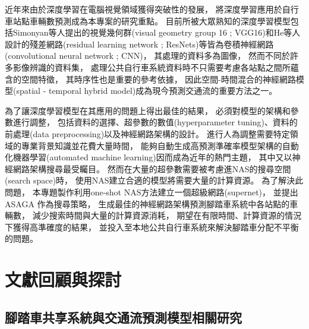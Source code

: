 \documentclass[a4paper,12pt]{extarticle}
\begin{document}
        近年來由於深度學習在電腦視覺領域獲得突破性的發展\cite{8114708}，
        將深度學習應用於自行車站點車輛數預測成為本專案的研究重點。
        目前所被大眾熟知的深度學習模型包括Simonyan等人提出的視覺幾何群(visual geometry group 16 ; VGG16)\cite{simonyan2014very}和He等人設計的殘差網路(residual learning network ; ResNets)\cite{he2016deep}等皆為卷積神經網路(convolutional neural network ; CNN)，
        其處理的資料多為圖像，
        然而不同於許多影像辨識的資料集，
        處理公共自行車系統資料時不只需要考慮各站點之間所蘊含的空間特徵，
        其時序性也是重要的參考依據，
        因此空間-時間混合的神經網路模型(spatial - temporal hybrid model)成為現今預測交通流的重要方法之一。
     
        為了讓深度學習模型在其應用的問題上得出最佳的結果，
        必須對模型的架構和參數進行調整，
        包括資料的選擇、超參數的數值(hyperparameter tuning)\cite{10.5555/2986459.2986743}、資料的前處理(data preprocessing)\cite{kotsiantis2006data}\cite{famili1997data}以及神經網路架構的設計。
        進行人為調整需要特定領域的專業背景知識並花費大量時間，
        能夠自動生成高預測準確率模型架構的自動化機器學習(automated machine learning)\cite{WARING2020101822}因而成為近年的熱門主題，
        其中又以神經網路架構搜尋\cite{elsken2019neural}最受矚目。
        然而在大量的超參數需要被考慮進NAS的搜尋空間(search space)時，
        使用NAS建立合適的模型將需要大量的計算資源\cite{zhao2020simplifying}。
        為了解決此問題，
        本專題製作利用one-shot NAS方法\cite{pmlr-v80-bender18a}建立一個超級網路(supernet)，
        並提出 ASAGA 作為搜尋策略，
        生成最佳的神經網路架構預測腳踏車系統中各站點的車輛數，
        減少搜索時間與大量的計算資源消耗，
        期望在有限時間、計算資源的情況下獲得高準確度的結果，
        並投入至本地公共自行車系統來解決腳踏車分配不平衡的問題。
    \newpage

    \section{文獻回顧與探討}
        \subsection{腳踏車共享系統與交通流預測模型相關研究}
            
\end{document}
